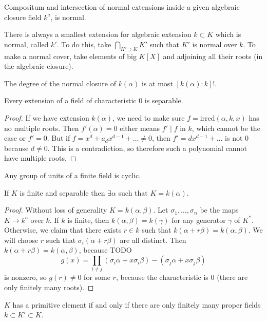 \begin{theorem}
    Compositum and intersection of normal extensions inside a given algebraic closure field $k^a$, is normal.
\end{theorem}

\begin{theorem}
    There is always a smallest extension for algebraic extension $k \subset K$
    which is normal, called $k'$. To do this, take $\bigcap_{K' \supset K} K'$
    such that $K'$ is normal over $k$.
    To make a normal cover, take elements of big $K[X]$ and adjoining all their roots (in the algebraic closure).
\end{theorem}

The degree of the normal closure of $k(\alpha)$ is at most $[k(\alpha): k]!$.

\begin{theorem}
    Every extension of a field of characteristic $0$ is separable.
    \begin{proof}
        If we have extension $k(\alpha)$,
        we need to make sure $f = \textrm{irred}(\alpha, k , x)$
        has no multiple roots. Then
        $f'(\alpha) = 0$ either means $f' \mid f$ in $k$, which cannot be the case
        or $f' = 0$. But if $f = x^d + a_d x^{d- 1} + \dots \neq 0$,
        then $f' = dx^{d - 1} + \dots$ is not $0$ because $d \neq 0$.
        This is a contradiction, so therefore such a polynomial cannot have multiple roots.
    \end{proof}
\end{theorem}

\begin{theorem}
    Any group of units of a finite field is cyclic.
\end{theorem}

\begin{theorem}
    If $K$ is finite and separable then $\exists \alpha$ such that $K = k(\alpha)$.
    \begin{proof}
        Without loss of generality $K = k(\alpha, \beta)$.
        Let $\sigma_1, \dots, \sigma_n$ be the maps $K \to k^a$ over $k$.
        If $k$ is finite, then $k(\alpha, \beta) = k(\gamma)$
        for any generator $\gamma$ of $K^*$. Otherwise, we claim
        that there exists $r \in k$ such that $k(\alpha + r \beta) = k(\alpha, \beta)$.
        We will choose $r$ such that $\sigma_i (\alpha + r \beta)$ are all distinct.
        Then $k(\alpha + r \beta) = k(\alpha, \beta)$, because TODO
        \[ g(x) = \prod_{i \neq j}  (\sigma_i \alpha + x \sigma_i \beta) - (\sigma_j \alpha + x \sigma_j \beta)\]
        is nonzero, so $g(r) \neq 0$ for some $r$, because the characteristic is $0$ (there are only finitely many roots).
    \end{proof}
\end{theorem}

\begin{theorem}
    $K$ has a primitive element if and only if there are only finitely many proper fields $k \subset K' \subset K$.
\end{theorem}